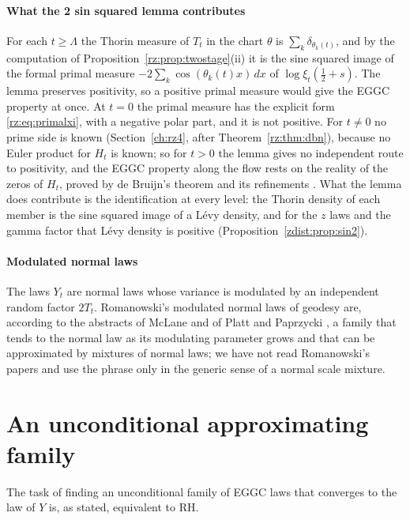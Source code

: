 \paragraph{What the 2 sin squared lemma contributes} For each $t\ge\Lambda$ the Thorin measure of $T_t$ in the chart $\theta$ is $\sum_k\delta_{\theta_k(t)}$, and by the computation of Proposition~\ref{rz:prop:twostage}(ii) it is the sine squared image of the formal primal measure $-2\sum_k\cos(\theta_k(t)x)\,dx$ of $\log\xi_t(\frac12+s)$. The lemma preserves positivity, so a positive primal measure would give the EGGC property at once. At $t=0$ the primal measure has the explicit form \eqref{rz:eq:primalxi}, with a negative polar part, and it is not positive. For $t\ne0$ no prime side is known (Section~\ref{ch:rz4}, after Theorem~\ref{rz:thm:dbn}), because no Euler product for $H_t$ is known; so for $t>0$ the lemma gives no independent route to positivity, and the EGGC property along the flow rests on the reality of the zeros of $H_t$, proved by de Bruijn's theorem and its refinements \cite{deBruijn,PT21}. What the lemma does contribute is the identification at every level: the Thorin density of each member is the sine squared image of a L\'evy density, and for the $z$ laws and the gamma factor that L\'evy density is positive (Proposition~\ref{zdist:prop:sin2}).

\paragraph{Modulated normal laws} The laws $Y_t$ are normal laws whose variance is modulated by an independent random factor $2T_t$. Romanowski's modulated normal laws of geodesy are, according to the abstracts of McLane \cite{NCMcLane67} and of Platt and Paprzycki \cite{NCPlattPaprzycki95}, a family that tends to the normal law as its modulating parameter grows and that can be approximated by mixtures of normal laws; we have not read Romanowski's papers and use the phrase only in the generic sense of a normal scale mixture.

\section{An unconditional approximating family}\label{zdist:sec:uncond}

The task of finding an unconditional family of EGGC laws that converges to the law of $Y$ is, as stated, equivalent to RH.

